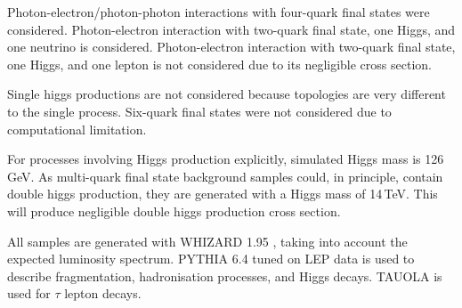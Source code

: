 Photon-electron/photon-photon interactions with four-quark final states were considered. Photon-electron interaction with two-quark final state, one Higgs, and one neutrino is considered. Photon-electron interaction with two-quark final state, one Higgs, and one lepton is not considered due to its negligible cross section.


Single higgs productions are not considered because topologies are very different to the single process.
Six-quark final states were not considered due to computational limitation.

For processes involving Higgs production explicitly, simulated Higgs mass is 126\,GeV.
As multi-quark final state background samples could, in principle, contain double higgs production, they are generated with a Higgs mass of 14\,TeV. This will produce negligible double higgs production cross section.






All samples are generated with WHIZARD 1.95 \cite{}, taking into account the expected \CLIC luminosity spectrum.
PYTHIA 6.4 \cite{} tuned on LEP data \cite{} is used to describe fragmentation, hadronisation processes, and Higgs decays. TAUOLA \cite{} is used for $\tau$ lepton decays.


